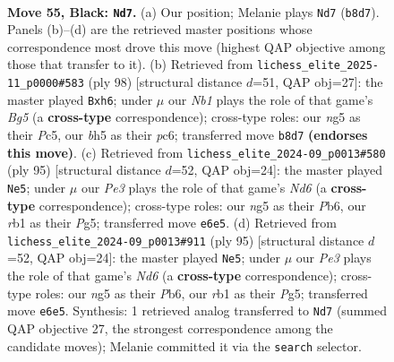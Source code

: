 \documentclass[11pt]{article}
\begin{document}
\clearpage

\begin{figure}[p]\centering
\begin{subfigure}{0.46\textwidth}\centering
\resizebox{\linewidth}{!}{%
\newchessgame
\chessboard[
  setfen={1nb3k1/P7/4p3/5pNB/1pN2P2/1Pn3P1/5K1P/1R6 b - - 0 55},
  showmover=false,
  pgfstyle=straightmove, color=movearrow, markmove={b8-d7}
]}
\caption{}
\end{subfigure}\hfill
\begin{subfigure}{0.46\textwidth}\centering
\resizebox{\linewidth}{!}{%
\newchessgame
\chessboard[
  setfen={1n4k1/8/p1pNp2p/1pPnP1B1/1P6/P4K2/8/8 w - - 0 50},
  showmover=false,
  pgfstyle=straightmove, color=movearrow, markmove={g5-h6}
]}
\caption{}
\end{subfigure}
\\[4pt]
\begin{subfigure}{0.46\textwidth}\centering
\resizebox{\linewidth}{!}{%
\newchessgame
\chessboard[
  setfen={3b4/5k2/pp6/1Np2pp1/2P5/1P1n4/P2BK1PP/8 b - - 1 48},
  showmover=false,
  pgfstyle=straightmove, color=movearrow, markmove={d3-e5}
]}
\caption{}
\end{subfigure}\hfill
\begin{subfigure}{0.46\textwidth}\centering
\resizebox{\linewidth}{!}{%
\newchessgame
\chessboard[
  setfen={3b4/5k2/pp6/1Np2pp1/2P5/1P1n4/P2BK1PP/8 b - - 1 48},
  showmover=false,
  pgfstyle=straightmove, color=movearrow, markmove={d3-e5}
]}
\caption{}
\end{subfigure}
\caption{\textbf{Move 55, Black: \texttt{Nd7}.} (a) Our position; Melanie plays \texttt{Nd7} (\texttt{b8d7}). Panels (b)--(d) are the retrieved master positions whose correspondence most drove this move (highest QAP objective among those that transfer to it). (b) Retrieved from \texttt{lichess\_elite\_2025-11\_p0000\#583} (ply 98) [structural distance $d$=51, QAP obj=27]: the master played \texttt{Bxh6}; under $\mu$ our \emph{Nb1} plays the role of that game's \emph{Bg5} (a \textbf{cross-type} correspondence); cross-type roles: our \emph{n}g5 as their \emph{P}c5, our \emph{b}h5 as their \emph{p}c6; transferred move \texttt{b8d7} \textbf{(endorses this move)}. (c) Retrieved from \texttt{lichess\_elite\_2024-09\_p0013\#580} (ply 95) [structural distance $d$=52, QAP obj=24]: the master played \texttt{Ne5}; under $\mu$ our \emph{Pe3} plays the role of that game's \emph{Nd6} (a \textbf{cross-type} correspondence); cross-type roles: our \emph{n}g5 as their \emph{P}b6, our \emph{r}b1 as their \emph{P}g5; transferred move \texttt{e6e5}. (d) Retrieved from \texttt{lichess\_elite\_2024-09\_p0013\#911} (ply 95) [structural distance $d$=52, QAP obj=24]: the master played \texttt{Ne5}; under $\mu$ our \emph{Pe3} plays the role of that game's \emph{Nd6} (a \textbf{cross-type} correspondence); cross-type roles: our \emph{n}g5 as their \emph{P}b6, our \emph{r}b1 as their \emph{P}g5; transferred move \texttt{e6e5}. Synthesis: 1 retrieved analog transferred to \texttt{Nd7} (summed QAP objective 27, the strongest correspondence among the candidate moves); Melanie committed it via the \texttt{search} selector.}
\label{fig:thought-m109}
\end{figure}
\end{document}

